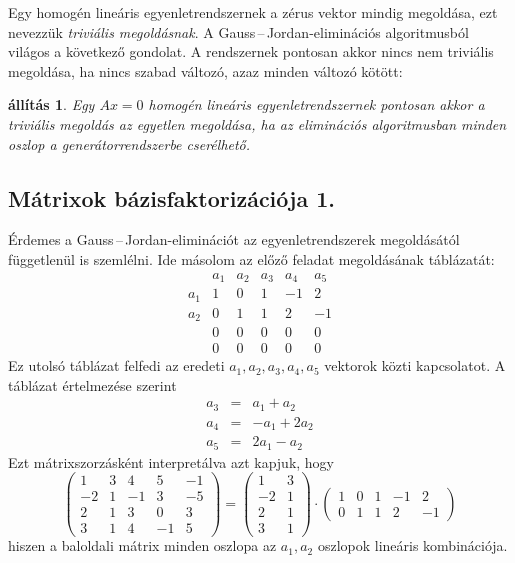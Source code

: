 \documentclass[9pt, a4paper, showtrims]{memoir}
\theoremstyle{plain}
\newtheorem{proposition}{állítás}[chapter]
\theoremstyle{remark}
\theoremstyle{definition}
\begin{document}
Egy homogén lineáris egyenletrendszernek a zérus vektor mindig megoldása,
ezt nevezzük \emph{triviális megoldásnak}.
A Gauss\,--\,Jordan-eliminációs  algoritmusból világos a következő gondolat.
A rendszernek pontosan akkor nincs nem triviális megoldása,
ha nincs szabad változó, azaz minden változó kötött:
\begin{proposition}
	Egy $Ax=0$ homogén lineáris egyenletrendszernek pontosan akkor a triviális megoldás az egyetlen megoldása,
	ha az eliminációs algoritmusban minden oszlop a generátorrendszerbe cserélhető.
\end{proposition}
\subsection{Mátrixok bázisfaktorizációja 1.}
Érdemes a Gauss\,--\,Jordan-eliminációt  az egyenletrendszerek megoldásától függetlenül is szemlélni.
Ide másolom az előző feladat megoldásának táblázatát:
\[
	\begin{array}{r|rrrrr}
		    & a_1 & a_2 & a_3 & a_4 & a_5 \\
		\hline
		a_1 & 1   & 0   & 1   & -1  & 2   \\
		a_2 & 0   & 1   & 1   & 2   & -1  \\
		    & 0   & 0   & 0   & 0   & 0   \\
		    & 0   & 0   & 0   & 0   & 0
	\end{array}
\]
Ez utolsó táblázat felfedi az eredeti $a_1,a_2,a_3,a_4,a_5$ vektorok közti kapcsolatot.
A táblázat értelmezése szerint
\begin{eqnarray*}
	a_3&=& a_1+a_2\\
	a_4&=& -a_1+2a_2\\
	a_5&=& 2a_1-a_2
\end{eqnarray*}
Ezt mátrixszorzásként interpretálva azt kapjuk, hogy
\[
	\begin{pmatrix}
		1  & 3 & 4  & 5  & -1 \\
		-2 & 1 & -1 & 3  & -5 \\
		2  & 1 & 3  & 0  & 3  \\
		3  & 1 & 4  & -1 & 5
	\end{pmatrix}
	=
	\begin{pmatrix}
		1  & 3 \\
		-2 & 1 \\
		2  & 1 \\
		3  & 1
	\end{pmatrix}
	\cdot
	\begin{pmatrix}
		1 & 0 & 1 & -1 & 2  \\
		0 & 1 & 1 & 2  & -1
	\end{pmatrix}
    \tag{\dag}\label{bazisfakt}
\]
hiszen a baloldali mátrix minden oszlopa az $a_1,a_2$ oszlopok lineáris kombinációja.
\end{document}
